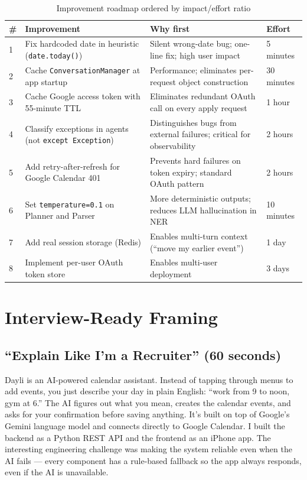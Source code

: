 \documentclass[12pt, a4paper]{article}
\begin{document}
\begin{table}[htbp]
\centering
\small
\renewcommand{\arraystretch}{1.4}
\begin{tabularx}{\textwidth}{C{0.6cm} L{4.2cm} X L{1.8cm}}
\toprule
\textbf{\#} & \textbf{Improvement} & \textbf{Why first} & \textbf{Effort} \\
  & Fix hardcoded date in heuristic (\texttt{date.today()})
  & Silent wrong-date bug; one-line fix; high user impact
  & 5 minutes \\
2
  & Cache \texttt{ConversationManager} at app startup
  & Performance; eliminates per-request object construction
  & 30 minutes \\
3
  & Cache Google access token with 55-minute TTL
  & Eliminates redundant OAuth call on every apply request
  & 1 hour \\
4
  & Classify exceptions in agents (not \texttt{except Exception})
  & Distinguishes bugs from external failures; critical for observability
  & 2 hours \\
5
  & Add retry-after-refresh for Google Calendar 401
  & Prevents hard failures on token expiry; standard OAuth pattern
  & 2 hours \\
6
  & Set \texttt{temperature=0.1} on Planner and Parser
  & More deterministic outputs; reduces LLM hallucination in NER
  & 10 minutes \\
7
  & Add real session storage (Redis)
  & Enables multi-turn context (``move my earlier event'')
  & 1 day \\
8
  & Implement per-user OAuth token store
  & Enables multi-user deployment
  & 3 days \\
\bottomrule
\end{tabularx}
\caption{Improvement roadmap ordered by impact/effort ratio}
\end{table}


\section{Interview-Ready Framing}

\subsection{``Explain Like I'm a Recruiter'' (60 seconds)}

\begin{interviewbox}
  Dayli is an AI-powered calendar assistant. Instead of tapping through menus to add events, you just describe your day in plain English: ``work from 9 to noon, gym at 6.'' The AI figures out what you mean, creates the calendar events, and asks for your confirmation before saving anything. It's built on top of Google's Gemini language model and connects directly to Google Calendar. I built the backend as a Python REST API and the frontend as an iPhone app. The interesting engineering challenge was making the system reliable even when the AI fails --- every component has a rule-based fallback so the app always responds, even if the AI is unavailable.
\end{interviewbox}
\end{document}
